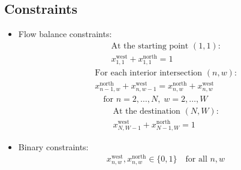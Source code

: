 \documentclass{article}
\begin{document}
\subsection*{Constraints}
\begin{itemize}
    \item Flow balance constraints:
    \begin{align*}
        &\text{At the starting point $(1,1)$:} \\
        &x_{1,1}^{\text{west}} + x_{1,1}^{\text{north}} = 1
    \end{align*}
    \begin{align*}
        &\text{For each interior intersection $(n,w)$:} \\
        &x_{n-1,w}^{\text{north}} + x_{n,w-1}^{\text{west}} = x_{n,w}^{\text{north}} + x_{n,w}^{\text{west}} \\
        &\quad \text{for } n = 2, \ldots, N, \; w = 2, \ldots, W
    \end{align*}
    \begin{align*}
        &\text{At the destination $(N,W)$:} \\
        &x_{N,W-1}^{\text{west}} + x_{N-1,W}^{\text{north}} = 1
    \end{align*}
    \item Binary constraints:
    \begin{align*}
        &x_{n,w}^{\text{west}}, x_{n,w}^{\text{north}} \in \{0, 1\} \quad \text{for all } n, w
    \end{align*}
\end{itemize}
\end{document}
